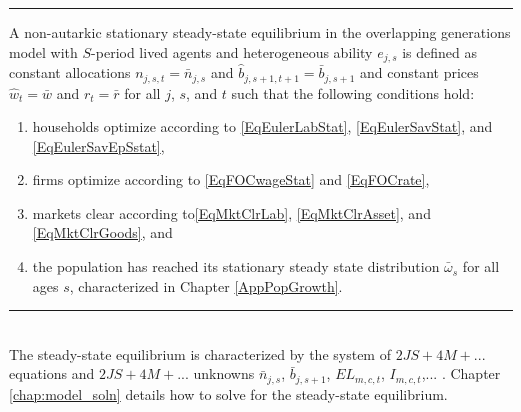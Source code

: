     \hrule
    \begin{definition}\label{DefEquilSS}
      A non-autarkic stationary steady-state equilibrium in the overlapping generations model with $S$-period lived agents and heterogeneous ability $e_{j,s}$ is defined as constant allocations $n_{j,s,t}=\bar{n}_{j,s}$ and $\hat{b}_{j,s+1,t+1}=\bar{b}_{j,s+1}$ and constant prices $\hat{w}_t=\bar{w}$ and $r_t=\bar{r}$ for all $j$, $s$, and $t$ such that the following conditions hold:
       \begin{enumerate}
          \item households optimize according to \eqref{EqEulerLabStat}, \eqref{EqEulerSavStat}, and \eqref{EqEulerSavEpSstat},
          \item firms optimize according to \eqref{EqFOCwageStat} and \eqref{EqFOCrate},
          \item markets clear according to\eqref{EqMktClrLab}, \eqref{EqMktClrAsset}, and \eqref{EqMktClrGoods}, and
          \item the population has reached its stationary steady state distribution $\bar{\omega}_s$ for all ages $s$, characterized in Chapter \ref{AppPopGrowth}.
       \end{enumerate}
    \end{definition}
    \hrule

\ \\

    The steady-state equilibrium is characterized by the system of $2JS+4M+...$ equations and $2JS+4M+...$ unknowns $\bar{n}_{j,s}$, $\bar{b}_{j,s+1}$, $EL_{m,c,t}$, $I_{m,c,t}$,... . Chapter \ref{chap:model_soln} details how to solve for the steady-state equilibrium.

